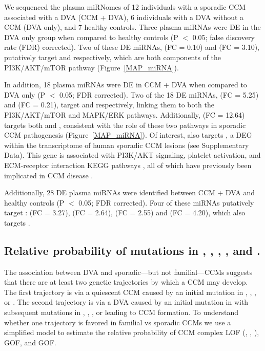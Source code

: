 We sequenced the plasma miRNomes of 12 individuals with a sporadic CCM associated with a DVA (CCM + DVA), 6 individuals with a DVA without a CCM (DVA only), and 7 healthy controls. Three plasma miRNAs were DE in the DVA only group when compared to healthy controls (P $<$ 0.05; false discovery rate (FDR) corrected). Two of these DE miRNAs,  (FC = 0.10) and  (FC = 3.10), putatively target  and  respectively, which are both components of the PI3K/AKT/mTOR pathway (Figure~\ref{MAP_miRNA}).

In addition, 18 plasma miRNAs were DE in CCM + DVA when compared to DVA only (P $<$ 0.05; FDR corrected). Two of the 18 DE miRNAs,  (FC = 5.25) and  (FC = 0.21), target  and  respectively, linking them to both the PI3K/AKT/mTOR and MAPK/ERK pathways. Additionally,  (FC = 12.64) targets both  and , consistent with the role of these two pathways in sporadic CCM pathogenesis (Figure~\ref{MAP_miRNA}). Of interest,  also targets , a DEG within the transcriptome of human sporadic CCM lesions (see Supplementary Data). This gene is associated with PI3K/AKT signaling, platelet activation, and ECM-receptor interaction KEGG pathways \citep{kanehisa2021, kanehisa2000}, all of which have previously been implicated in CCM disease \citep{faurobert2013, hong2021, ramirez2019, ren2021}.

Additionally, 28 DE plasma miRNAs were identified between CCM + DVA and healthy controls (P $<$ 0.05; FDR corrected). Four of these miRNAs putatively target :  (FC = 3.27),  (FC = 2.64),  (FC = 2.55) and  (FC = 4.20), which also targets . 


\subsection{Relative probability of mutations in , , , , and . }

The association between DVA and sporadic---but not familial---CCMs suggests that there are at least two genetic trajectories by which a CCM may develop. The first trajectory is via a quiescent CCM caused by an initial mutation in , , , or . The second trajectory is via a DVA caused by an initial mutation in  with subsequent mutations in , , , or  leading to CCM formation. To understand whether one trajectory is favored in familial vs sporadic CCMs we use a simplified model to estimate the relative probability of CCM complex LOF (, , ),  GOF, and  GOF. 

